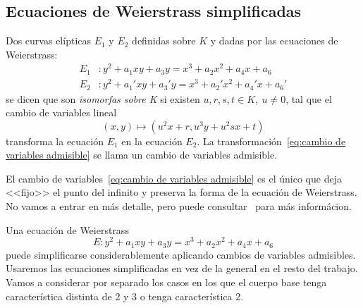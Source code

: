 \subsection{Ecuaciones de Weierstrass simplificadas}
\label{sub:Ecuaciones de Weierstrass simplificadas}

\begin{definicion}
	Dos curvas elípticas $E_1$ y $E_2$ definidas sobre $K$ y dadas por las ecuaciones de Weierstrass:
	\begin{align*}
		E_1 &: y^2 + a_1 x y + a_3 y = x^3 + a_2 x^2 + a_4 x + a_6 \\
		E_2 &: y^2 + a_1' x y + a_3' y = x^3 + a_2' x^2 + a_4' x + a_6'
	\end{align*}
	se dicen que son \emph{isomorfas sobre K} si existen $u, r, s, t \in K,\ u \neq 0$, tal que el cambio de variables lineal
	\begin{equation}\label{eq:cambio de variables admisible}
	(x, y) \mapsto (u^2 x + r, u^3 y + u^2 s x + t)
	\end{equation}
	transforma la ecuación $E_1$ en la ecuación $E_2$. La transformación~\eqref{eq:cambio de variables admisible} se llama un cambio de variables admisible.

	El cambio de variables~\eqref{eq:cambio de variables admisible} es el único que deja <<fijo>> el punto del infinito y preserva la forma de la ecuación de Weierstrass. No vamos a entrar en más detalle, pero puede consultar~\cite[prop. III.3.1b]{Silverman:2009} para más informácion.
\end{definicion}


Una ecuación de Weierstrass
$$
E:  y^2 + a_1 x y + a_3 y = x^3 + a_2 x^2 + a_4 x + a_6
$$
puede simplificarse considerablemente aplicando cambios de variables admisibles. Usaremos las ecuaciones simplificadas en vez de la general en el resto del trabajo. Vamos a considerar por separado los casos en los que el cuerpo base tenga característica distinta de 2 y 3 o tenga característica 2.

